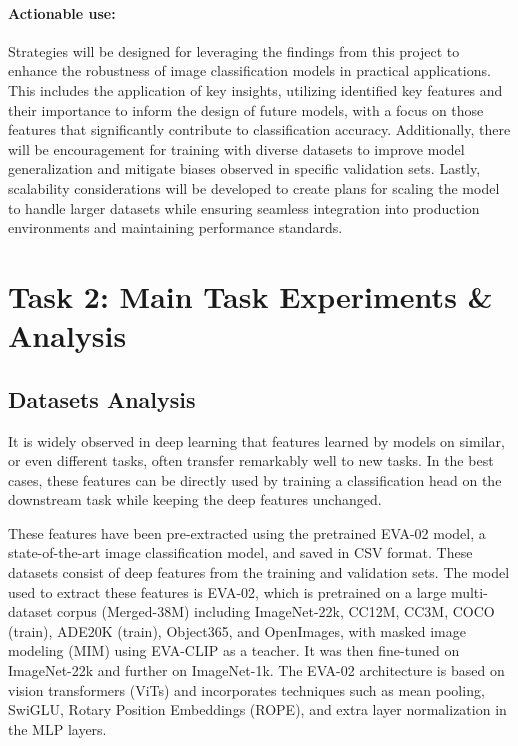 \documentclass[a4paper,11pt]{article}
\begin{document}
\paragraph{Actionable use:}  
Strategies will be designed for leveraging the findings from this project to enhance the robustness of image classification models in practical applications. This includes the application of key insights, utilizing identified key features and their importance to inform the design of future models, with a focus on those features that significantly contribute to classification accuracy. Additionally, there will be encouragement for training with diverse datasets to improve model generalization and mitigate biases observed in specific validation sets. Lastly, scalability considerations will be developed to create plans for scaling the model to handle larger datasets while ensuring seamless integration into production environments and maintaining performance standards.



\section{Task 2: Main Task Experiments \& Analysis}
\subsection{Datasets Analysis}
It is widely observed in deep learning that features learned by models on similar, or even different tasks, often transfer remarkably well to new tasks. In the best cases, these features can be directly used by training a classification head on the downstream task while keeping the deep features unchanged. 

These features have been pre-extracted using the pretrained EVA-02 model, a state-of-the-art image classification model, and saved in CSV format. These datasets consist of deep features from the training and validation sets. The model used to extract these features is EVA-02, which is pretrained on a large multi-dataset corpus (Merged-38M) including ImageNet-22k, CC12M, CC3M, COCO (train), ADE20K (train), Object365, and OpenImages, with masked image modeling (MIM) using EVA-CLIP as a teacher. It was then fine-tuned on ImageNet-22k and further on ImageNet-1k. The EVA-02 architecture is based on vision transformers (ViTs) and incorporates techniques such as mean pooling, SwiGLU, Rotary Position Embeddings (ROPE), and extra layer normalization in the MLP layers.
\end{document}
